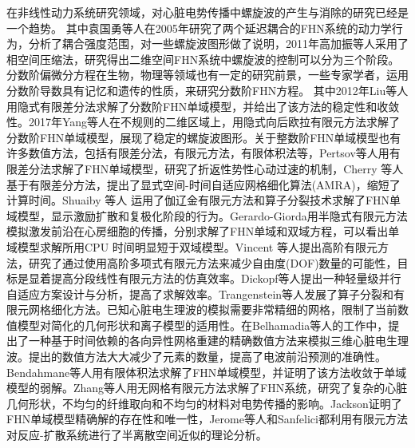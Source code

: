 \documentclass[twoside,UTF8]{nputhesis}
\begin{document}
在非线性动力系统研究领域，对心脏电势传播中螺旋波的产生与消除的研究已经是一个趋势\cite{ouyang2001,yuan2005,tangguoning2010,gao2011}。 其中袁国勇等人在2005年研究了两个延迟耦合的FHN系统的动力学行为，分析了耦合强度范围，对一些螺旋波图形做了说明，2011年高加振等人采用了相空间压缩法，研究得出二维空间FHN系统中螺旋波的控制可以分为三个阶段。分数阶偏微分方程在生物，物理等领域也有一定的研究前景，一些专家学者，运用分数阶导数具有记忆和遗传的性质，来研究分数阶FHN方程\cite{LFW2012,Buweiping2015,LFW2015,YZZ2017}。 其中2012年Liu等人用隐式有限差分法求解了分数阶FHN单域模型，并给出了该方法的稳定性和收敛性。2017年Yang等人在不规则的二维区域上，用隐式向后欧拉有限元方法求解了分数阶FHN单域模型，展现了稳定的螺旋波图形。关于整数阶FHN单域模型也有许多数值方法，包括有限差分法，有限元方法，有限体积法等，Pertsov等人\cite{Pertsov1993}用有限差分法求解了FHN单域模型，研究了折返性势性心动过速的机制，Cherry 等人\cite{chafen2000}基于有限差分方法，提出了显式空间-时间自适应网格细化算法(AMRA)，缩短了计算时间。Shuaiby 等人\cite{SM1} 运用了伽辽金有限元方法和算子分裂技术求解了FHN单域模型，显示激励扩散和复极化阶段的行为。Gerardo-Giorda\cite{GG2008}用半隐式有限元方法模拟激发前沿在心房细胞的传播，分别求解了FHN单域和双域方程，可以看出单域模型求解所用CPU 时间明显短于双域模型。Vincent 等人\cite{Vincent2015}提出高阶有限元方法，研究了通过使用高阶多项式有限元方法来减少自由度(DOF)数量的可能性，目标是显着提高分段线性有限元方法的仿真效率。Dickopf等人\cite{Dickopf2014}提出一种轻量级并行自适应方案设计与分析，提高了求解效率。Trangenstein等人\cite{Trangenstein2000}发展了算子分裂和有限元网格细化方法。已知心脏电生理波的模拟需要非常精细的网格，限制了当前数值模型对简化的几何形状和离子模型的适用性。在Belhamadia等人\cite{Belhamadia2009}的工作中，提出了一种基于时间依赖的各向异性网格重建的精确数值方法来模拟三维心脏电生理波。提出的数值方法大大减少了元素的数量，提高了电波前沿预测的准确性。Bendahmane等人\cite{Bendahmane2010}用有限体积法求解了FHN单域模型，并证明了该方法收敛于单域模型的弱解。Zhang等人\cite{zhang2005}用无网格有限元方法求解了FHN系统，研究了复杂的心脏几何形状，不均匀的纤维取向和不均匀的材料对电势传播的影响。Jackson\cite{Jackson1990,Jackson1992}证明了FHN单域模型精确解的存在性和唯一性，Jerome等人\cite{Jerome1980}和Sanfelici\cite{SAN1996}都利用有限元方法对反应-扩散系统进行了半离散空间近似的理论分析。
\end{document}
